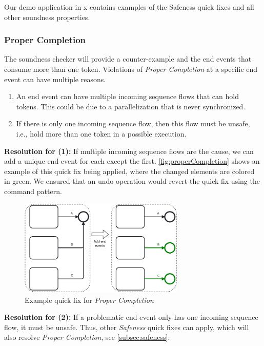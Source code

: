 \documentclass[runningheads]{llncs}
\begin{document}
Our demo application in x contains examples of the Safeness quick fixes and all other soundness properties.

\subsubsection{Proper Completion}
The soundness checker will provide a counter-example and the end events that consume more than one token.
Violations of \textit{Proper Completion} at a specific end event can have multiple reasons.

\begin{enumerate}
	\item An end event can have multiple incoming sequence flows that can hold tokens.
	This could be due to a parallelization that is never synchronized.
	\item If there is only one incoming sequence flow, then this flow must be unsafe, i.e., hold more than one token in a possible execution.
\end{enumerate}

\textbf{Resolution for (1):} If multiple incoming sequence flows are the cause, we can add a unique end event for each except the first.
\autoref{fig:properCompletion} shows an example of this quick fix being applied, where the changed elements are colored in green.
We ensured that an undo operation would revert the quick fix using the command pattern.

\begin{figure}[ht]
	\centering
	\includegraphics[width=0.7\textwidth]{images/properCompletion}
	\caption{Example quick fix for \textit{Proper Completion}}
	\label{fig:properCompletion}
\end{figure}

\textbf{Resolution for (2):} If a problematic end event only has one incoming sequence flow, it must be unsafe.
Thus, other \textit{Safeness} quick fixes can apply, which will also resolve \textit{Proper Completion}, see \autoref{subsec:safeness}.
\end{document}
